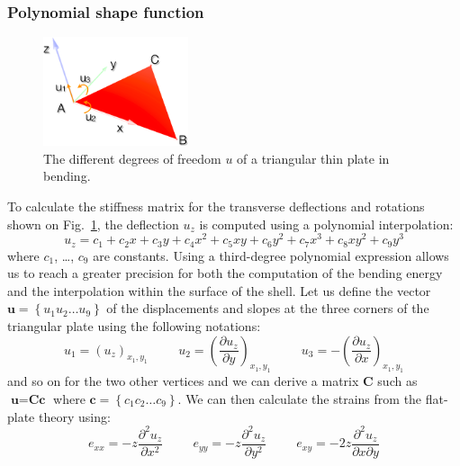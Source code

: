 \documentclass{llncs}
\begin{document}
\subsubsection{Polynomial shape function}
%
\begin{figure}
\centering
\includegraphics[height=3.2cm]{images/bending}
\caption {The different degrees of freedom $u$ of a triangular thin plate in bending.}
\label{fig-triangle}
\end{figure}
%
To calculate the stiffness matrix for the transverse deflections and rotations shown on Fig.~\ref{fig-triangle}, the deflection $u_z$ is computed using a polynomial interpolation:
\begin{equation}
 u_z = c_1 + c_2x + c_3y + c_4x^2 + c_5xy + c_6y^2 + c_7x^3 + c_8xy^2 + c_9y^3
\label{eq-deflection}
\end{equation} 
where $c_1$, \ldots , $c_9$ are constants. Using a third-degree polynomial expression allows us to reach a greater precision for both the computation of the bending energy and the interpolation within the surface of the shell. Let us define the vector $\textbf{u} = \left\{u_1 u_2 \ldots u_9 \right\} $ of the displacements and slopes at the three corners of the triangular plate using the following notations:
\begin{equation}
u_1 = (u_z)_{x_1,y_1} \hspace{1cm} u_2 = \left(\frac{\partial u_z}{\partial y}\right)_{x_1,y_1} \hspace{1cm} u_3 = - \left(\frac{\partial u_z}{\partial x}\right)_{x_1,y_1}
\end{equation} 
and so on for the two other vertices and we can derive a matrix $\textbf{C}$ such as $\textbf{u} = \textbf{Cc}$ where $\textbf{c} = \left\{c_1 c_2 \ldots c_9 \right\} $. We can then calculate the strains from the flat-plate theory using:
\begin{equation}
\label{eq-deformation}
e_{xx} = -z \frac{\partial^2u_z}{\partial x^2}
\hspace{1cm}
e_{yy} = -z \frac{\partial^2u_z}{\partial y^2}
\hspace{1cm}
e_{xy} = -2z \frac{\partial^2u_z}{\partial x \partial y}
\end{equation} 
\end{document}
